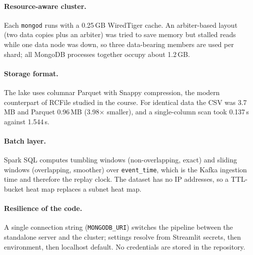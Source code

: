 \paragraph{Resource-aware cluster.} Each \texttt{mongod} runs with a 0.25\,GB WiredTiger cache. An arbiter-based layout (two data copies plus an arbiter) was tried to save memory but stalled reads while one data node was down, so three data-bearing members are used per shard; all MongoDB processes together occupy about 1.2\,GB.

\paragraph{Storage format.} The lake uses columnar Parquet with Snappy compression, the modern counterpart of RCFile studied in the course. For identical data the CSV was 3.7\,MB and Parquet 0.96\,MB (3.98$\times$ smaller), and a single-column scan took 0.137\,s against 1.544\,s.

\paragraph{Batch layer.} Spark SQL computes tumbling windows (non-overlapping, exact) and sliding windows (overlapping, smoother) over \texttt{event\_time}, which is the Kafka ingestion time and therefore the replay clock. The dataset has no IP addresses, so a TTL-bucket heat map replaces a subnet heat map.

\paragraph{Resilience of the code.} A single connection string (\texttt{MONGODB\_URI}) switches the pipeline between the standalone server and the cluster; settings resolve from Streamlit secrets, then environment, then localhost default. No credentials are stored in the repository.
